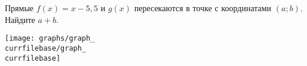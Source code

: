 \begin{ex}
	\begin{condition}
		\begin{minipage}[t]{0.67\textwidth}
			Прямые \( f(x)=x-5,5 \) и \( g(x) \) пересекаются в точке с координатами \( (a;b) \). Найдите \( a+b \).
		\end{minipage}
		\begin{minipage}[c]{0.25\textwidth}
			\texttt{[image: graphs/graph\_\\currfilebase/graph\_\\currfilebase]}
		\end{minipage}
	\end{condition}
\end{ex}